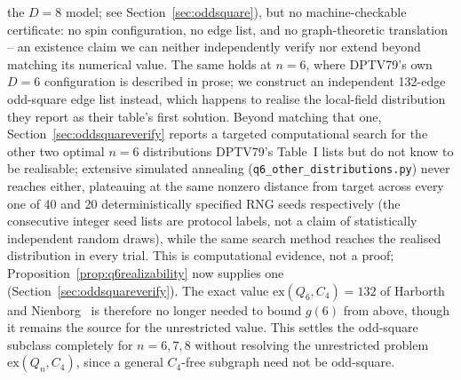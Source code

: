 \documentclass[12pt,a4paper]{article}
\theoremstyle{definition}
\newcommand{\ex}{\mathrm{ex}}
\begin{document}
the $D{=}8$ model; see Section~\ref{sec:oddsquare}),
but no machine-checkable certificate: no spin configuration, no edge list,
and no graph-theoretic translation -- an existence claim we can neither
independently verify nor extend beyond matching its numerical value. The same holds at $n=6$, where DPTV79's own $D=6$
configuration is described in prose; we construct an independent
132-edge odd-square edge list instead, which happens to realise the
local-field distribution they report as their table's first solution.
Beyond matching that one, Section~\ref{sec:oddsquareverify} reports a
targeted computational search for the other two optimal $n=6$
distributions DPTV79's Table~I lists but do not know to be realisable;
extensive simulated annealing (\texttt{q6\_other\_distributions.py})
never reaches either, plateauing at the same nonzero distance from
target across every one of 40 and 20 deterministically specified RNG
seeds respectively (the consecutive integer seed lists are protocol labels,
not a claim of statistically independent random draws), while the same search
method reaches the realised distribution in every trial. This is computational evidence, not a
proof; Proposition~\ref{prop:q6realizability} now supplies one
(Section~\ref{sec:oddsquareverify}). The exact value
$\ex(Q_6,C_4)=132$ of Harborth and Nienborg~\cite{HN94} is therefore no
longer needed to bound $g(6)$ from above, though it remains the source
for the unrestricted value. This settles
the odd-square subclass completely for $n=6,7,8$ without resolving the
unrestricted problem $\ex(Q_n,C_4)$, since a general $C_4$-free subgraph
need not be odd-square.
\end{document}
